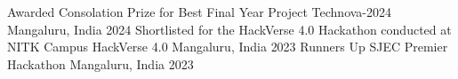 \begin{cvhonors}
  \cvhonor
    {Awarded Consolation Prize for Best Final Year Project} %
    {Technova-2024} %
    {Mangaluru, India} %
    {2024} %
  \cvhonor
    {Shortlisted for the HackVerse 4.0 Hackathon conducted at NITK Campus}
    {HackVerse 4.0}
    {Mangaluru, India}
    {2023}
  \cvhonor
    {Runners Up}
    {SJEC Premier Hackathon}
    {Mangaluru, India}
    {2023}
\end{cvhonors}